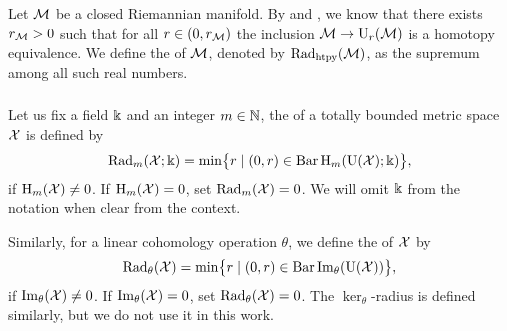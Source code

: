%
%

\subsubsection{}\label{ss:first_critical_value}

Let \(\cM\) be a closed Riemannian manifold.
By \cite[Thm.~3.5]{hausmann1995vietoris} and \cite[Thm.~4.1]{lim2024vietoris}, we know that there exists \(r_\cM > 0\) such that for all \(r \in (0, r_\cM)\) the inclusion \(\cM \to \rU_{r}(\cM)\) is a homotopy equivalence.
We define the  of \(\cM\), denoted by \(\crit(\cM)\), as the supremum among all such real numbers.

\subsubsection{} \label{ss:beta v.s. fillrad}

Let us fix a field \(\field\) and an integer \(m \in \N\), the  of a totally bounded metric space \(\cX\) is defined by
\[
\firstdeath{m}{\cX; \field} = \min\set[\big]{r \mid (0, r) \in \barc \rH_m(\rU(\cX); \field)},
\]
if \(\rH_\degp(\cX) \neq 0\).
If \(\rH_\degp(\cX) = 0\), set \(\firstdeath{m}{\cX} = 0\).
We will omit \(\field\) from the notation when clear from the context.

Similarly, for a linear cohomology operation \(\theta\), we define the  of \(\cX\) by
\[
\firstdeath{\theta}{\cX} = \min\set[\big]{r \mid (0, r) \in \barc \img_\theta(\rU(\cX))},
\]
if \(\img_\theta(\cX) \neq 0\).
If \(\img_\theta(\cX) = 0\), set $\firstdeath{\theta}{\cX} = 0$.
The \(\ker_\theta\)-radius is defined similarly, but we do not use it in this work.

